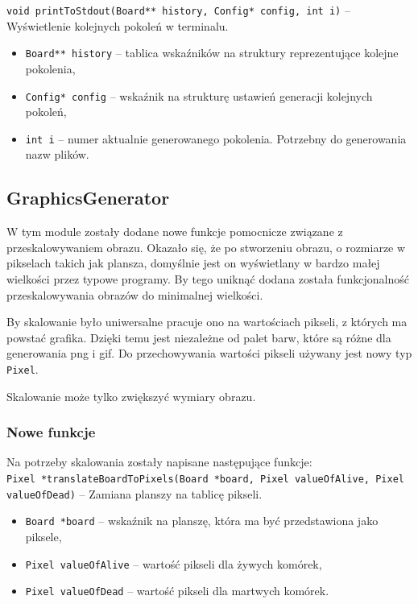 \documentclass{mwart}
\begin{document}
\noindent{}\texttt{void printToStdout(Board** history, Config* config, int i)} -- Wyświetlenie kolejnych pokoleń w terminalu.
\begin{itemize}[label={}]
	\item\texttt{Board** history} -- tablica wskaźników na struktury reprezentujące kolejne pokolenia,
	\item\texttt{Config* config} -- wskaźnik na strukturę ustawień generacji kolejnych pokoleń,
	\item \texttt{int i} -- numer aktualnie generowanego pokolenia. Potrzebny do generowania nazw plików.
\end{itemize}

\subsection{GraphicsGenerator}
W tym module zostały dodane nowe funkcje pomocnicze związane z przeskalowywaniem obrazu. Okazało się, że po stworzeniu obrazu, o rozmiarze w pikselach takich jak plansza, domyślnie jest on wyświetlany w bardzo małej wielkości przez typowe programy. By tego uniknąć dodana została funkcjonalność przeskalowywania obrazów do minimalnej wielkości.

By skalowanie było uniwersalne pracuje ono na wartościach pikseli, z których ma powstać grafika. Dzięki temu jest niezależne od palet barw, które są różne dla generowania png i gif. Do przechowywania wartości pikseli używany jest nowy typ \texttt{Pixel}.

Skalowanie może tylko zwiększyć wymiary obrazu.

\subsubsection*{Nowe funkcje}
Na potrzeby skalowania zostały napisane następujące funkcje:\\
\noindent{}\texttt{Pixel *translateBoardToPixels(Board *board, Pixel valueOfAlive, Pixel valueOfDead)} -- Zamiana planszy na tablicę pikseli.
\begin{itemize}[label={}]
	\item\texttt{Board *board} -- wskaźnik na planszę, która ma być przedstawiona jako piksele,
	\item\texttt{Pixel valueOfAlive} -- wartość pikseli dla żywych komórek,
	\item \texttt{Pixel valueOfDead} -- wartość pikseli dla martwych komórek.
\end{itemize}
\end{document}
